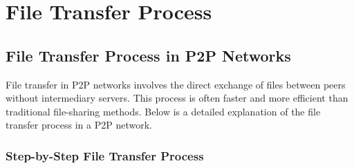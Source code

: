 \section{File Transfer Process}

\subsection{File Transfer Process in P2P Networks}

File transfer in P2P networks involves the direct exchange of files between peers without intermediary servers. This process is often faster and more efficient than traditional file-sharing methods. Below is a detailed explanation of the file transfer process in a P2P network.

\subsubsection{Step-by-Step File Transfer Process}
